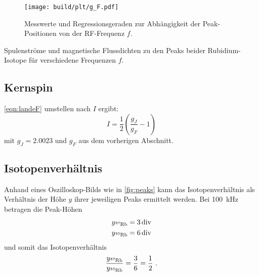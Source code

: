\begin{figure}
    \centering
    \texttt{[image: build/plt/g\_F.pdf]}
    \caption{Messwerte und Regressionsgeraden zur Abhängigkeit der Peak-Positionen von der RF-Frequenz $f$.}
    \label{fig:plt:g_F}
\end{figure}

\begin{table}
    \centering
    \caption{Spulenströme und magnetische Flussdichten zu den Peaks beider Rubidium-Isotope für verschiedene Frequenzen $f$.}
    \label{tab:mess}
\end{table}



\subsection{Kernspin}


\autoref{eqn:landeF} umstellen nach $I$ ergibt:
\[
    I = \frac{1}{2} \left( \frac{g_J}{g_F} - 1 \right)
\]
mit $g_J = \num{2.0023}$ und $g_F$ aus dem vorherigen Abschnitt.


\subsection{Isotopenverhältnis}
Anhand eines Oszilloskop-Bilds wie in \autoref{fig:peaks} kann das Isotopenverhältnis
als Verhältnis der Höhe $y$ ihrer jeweiligen Peaks ermittelt werden.
Bei \SI{100}{\kilo\hertz} betragen die Peak-Höhen
\begin{align*}
    y_{\Rb{87}} &= \SI{3}{{div}} \\ %
    y_{\Rb{85}} &= \SI{6}{{div}} \\ %
\end{align*}
und somit das Isotopenverhältnis
\[
    \frac{y_{\Rb{87}}}{y_{\Rb{85}}}
    = \frac{3}{6}
    = \frac{1}{2} \ .
\]


